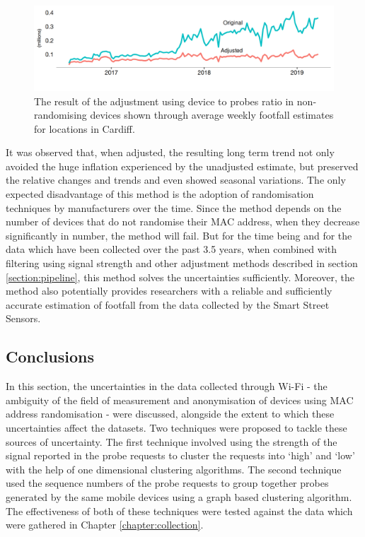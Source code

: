 \begin{figure}
  \includegraphics{images/processing-sss-final.png}
  \caption{The result of the adjustment using device to probes ratio in non-randomising devices shown through average weekly footfall estimates for locations in Cardiff.}
  \label{figure:processing:sss:final}
\end{figure}

It was observed that, when adjusted, the resulting long term trend not only avoided the huge inflation experienced by the unadjusted estimate, but preserved the relative changes and trends and even showed seasonal variations.
The only expected disadvantage of this method is the adoption of randomisation techniques by manufacturers over the time.
Since the method depends on the number of devices that do not randomise their MAC address, when they decrease significantly in number, the method will fail.
But for the time being and for the data which have been collected over the past 3.5 years, when combined with filtering using signal strength and other adjustment methods described in section \ref{section:pipeline}, this method solves the uncertainties sufficiently.
Moreover, the method also potentially provides researchers with a reliable and sufficiently accurate estimation of footfall from the data collected by the Smart Street Sensors.

\subsection{Conclusions}

In this section, the uncertainties in the data collected through Wi-Fi - the ambiguity of the field of measurement and anonymisation of devices using MAC address randomisation - were discussed, alongside the extent to which these uncertainties affect the datasets.
Two techniques were proposed to tackle these sources of uncertainty.
The first technique involved using the strength of the signal reported in the probe requests to cluster the requests into ‘high’ and ‘low’ with the help of one dimensional clustering algorithms.
The second technique used the sequence numbers of the probe requests to group together probes generated by the same mobile devices using a graph based clustering algorithm.
The effectiveness of both of these techniques were tested against the data which were gathered in  Chapter \ref{chapter:collection}.

